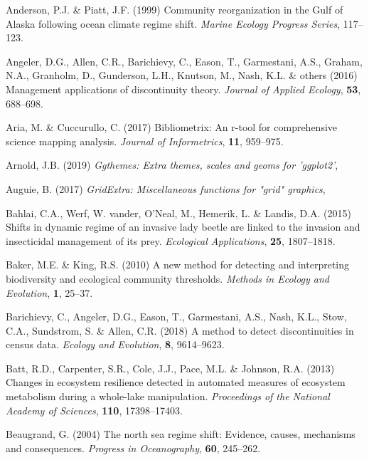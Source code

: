 \documentclass[12pt,twoside,openany]{reedthesis}
\begin{document}
\leavevmode\hypertarget{ref-anderson_community_1999}{}%
Anderson, P.J. \& Piatt, J.F. (1999) Community reorganization in the Gulf of Alaska following ocean climate regime shift. \emph{Marine Ecology Progress Series}, 117--123.

\leavevmode\hypertarget{ref-angeler2016management}{}%
Angeler, D.G., Allen, C.R., Barichievy, C., Eason, T., Garmestani, A.S., Graham, N.A., Granholm, D., Gunderson, L.H., Knutson, M., Nash, K.L. \& others (2016) Management applications of discontinuity theory. \emph{Journal of Applied Ecology}, \textbf{53}, 688--698.

\leavevmode\hypertarget{ref-bibliometrix}{}%
Aria, M. \& Cuccurullo, C. (2017) Bibliometrix: An r-tool for comprehensive science mapping analysis. \emph{Journal of Informetrics}, \textbf{11}, 959--975.

\leavevmode\hypertarget{ref-ggthemes}{}%
Arnold, J.B. (2019) \emph{Ggthemes: Extra themes, scales and geoms for 'ggplot2'},

\leavevmode\hypertarget{ref-gridExtra}{}%
Auguie, B. (2017) \emph{GridExtra: Miscellaneous functions for "grid" graphics},

\leavevmode\hypertarget{ref-bahlai2015shifts}{}%
Bahlai, C.A., Werf, W. vander, O'Neal, M., Hemerik, L. \& Landis, D.A. (2015) Shifts in dynamic regime of an invasive lady beetle are linked to the invasion and insecticidal management of its prey. \emph{Ecological Applications}, \textbf{25}, 1807--1818.

\leavevmode\hypertarget{ref-baker2010new}{}%
Baker, M.E. \& King, R.S. (2010) A new method for detecting and interpreting biodiversity and ecological community thresholds. \emph{Methods in Ecology and Evolution}, \textbf{1}, 25--37.

\leavevmode\hypertarget{ref-barichievy2018method}{}%
Barichievy, C., Angeler, D.G., Eason, T., Garmestani, A.S., Nash, K.L., Stow, C.A., Sundstrom, S. \& Allen, C.R. (2018) A method to detect discontinuities in census data. \emph{Ecology and Evolution}, \textbf{8}, 9614--9623.

\leavevmode\hypertarget{ref-batt2013changes}{}%
Batt, R.D., Carpenter, S.R., Cole, J.J., Pace, M.L. \& Johnson, R.A. (2013) Changes in ecosystem resilience detected in automated measures of ecosystem metabolism during a whole-lake manipulation. \emph{Proceedings of the National Academy of Sciences}, \textbf{110}, 17398--17403.

\leavevmode\hypertarget{ref-beaugrand2004north}{}%
Beaugrand, G. (2004) The north sea regime shift: Evidence, causes, mechanisms and consequences. \emph{Progress in Oceanography}, \textbf{60}, 245--262.
\end{document}
